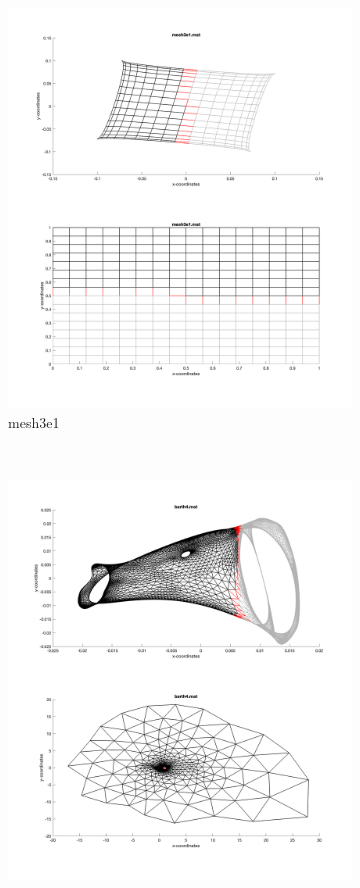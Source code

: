 \begin{figure}[H]
	\centering
	\begin{subfigure}{0.5\textwidth}
		\includegraphics[width=\textwidth]{./media/mesh3e1_eigen.png}
		\caption{mesh3e1}
		\label{fig:spec_crack}
	\end{subfigure}%
	~
	\begin{subfigure}{0.5\textwidth}
		\includegraphics[width=\textwidth]{./media/barth4_eigen.png}

\end{subfigure}
\end{figure}
